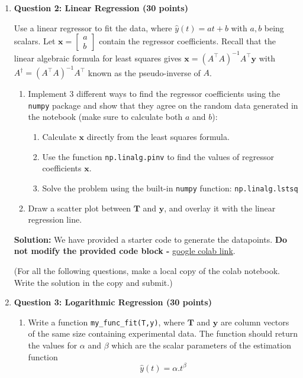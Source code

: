 \documentclass[11pt,letterpaper]{article}
\begin{document}
\begin{enumerate}
\clearpage
\item[] \textbf{Question 2: Linear Regression (30 points)}

Use a linear regressor to fit the data, where $\hat{y}(t)=at+b$ with $a,b$ being scalars. Let $\mathbf{x} = \begin{bmatrix} a \\ b \end{bmatrix}$ contain the regressor coefficients. Recall that the linear algebraic formula for least squares gives $\mathbf{x} = (A^\top A)^{-1} A^\top \mathbf{y}$ with $A^\dagger=(A^\top A)^{-1} A^\top$ known as the pseudo-inverse of $A$.

\begin{enumerate}[label=(\alph*)]
    \item Implement 3 different ways to find the regressor coefficients using the \texttt{numpy} package and show that they agree on the random data generated in the notebook (make sure to calculate both $a$ and $b$):
    \begin{enumerate}[label=\roman*]
        \item Calculate $\mathbf{x}$ directly from the least squares formula.
        \item Use the function \texttt{np.linalg.pinv} to find the values of regressor coefficients $\mathbf{x}$.
        \item Solve the problem using the built-in \texttt{numpy} function: \texttt{np.linalg.lstsq}
    \end{enumerate}
    \item Draw a scatter plot between $\mathbf{T}$ and $\mathbf{y}$, and overlay it with the linear regression line.
\end{enumerate}

\textbf{Solution:}
We have provided a starter code to generate the datapoints. \textbf{Do not modify the provided code block - } \href{https://colab.research.google.com/drive/1lAyQW20omCqQD04MxgjxkkFCrvm4s_bF?usp=sharing}{google colab link}.

(For all the following questions, make a local copy of the colab notebook. Write the solution in the copy and submit.)

\clearpage
\item[] \textbf{Question 3: Logarithmic Regression (30 points)}

\begin{enumerate}[label=(\alph*)]
    \item Write a function \texttt{my\_func\_fit(T,y)}, where $\mathbf{T}$ and $\mathbf{y}$ are column vectors of the same size containing experimental data. The function should return the values for $\alpha$ and $\beta$ which are the scalar parameters of the estimation function $$\hat{y}(t) = \alpha.t^{\beta}$$


\end{enumerate}
\end{enumerate}
\end{document}
